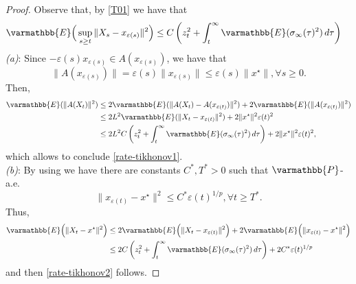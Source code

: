 \documentclass[11pt,reqno]{article}
\let\mathbb=\varmathbb
\renewcommand{\epsilon}{\varepsilon}
\newcommand{\1}{\mathds{1}}
\numberwithin{equation}{section}  %
\theoremstyle{plain}
\theoremstyle{definition}
\theoremstyle{remark}
\numberwithin{theorem}{section}
\numberwithin{remark}{section}
\numberwithin{example}{section}
\begin{document}
\begin{proof}
    Observe that, by \eqref{T01} we have  that 
    \begin{equation*}
        \begin{aligned}
        \mathbb{E}\Big(\sup_{s\geq t}\|X_{s}-x_{\epsilon(s)}\|^2\Big) 
		&\leq C \left( z_{t}^2  +  \int_{t}^\infty \mathbb{E}(\sigma_\infty(\tau)^2) \, d\tau \right)
        \end{aligned}
    \end{equation*}
    \emph{(a)}: Since $-\epsilon(s)x_{\epsilon(s)}\in A(x_{\epsilon(s)})$, we have that $$\|A(x_{\epsilon(s)})\| = \epsilon(s)\|x_{\epsilon(s)}\|\leq \epsilon(s)\|x^\star\|, \forall s\geq 0.$$
    Then,
    \begin{equation*}
        \begin{aligned}
            \mathbb{E}(\|A(X_t)\|^2) &\leq 2\mathbb{E}(\|A(X_t)-A(x_{\epsilon(t)})\|^2) + 2\mathbb{E}(\|A(x_{\epsilon(t)})\|^2)\\
            &\leq 2L^2\mathbb{E}(\|X_t-x_{\epsilon(t)}\|^2) + 2\|x^\star\|^2\epsilon(t)^2\\
            &\leq 2L^2C \left(z_t^2  +  \int_{t}^\infty \mathbb{E}(\sigma_\infty(\tau)^2) \, d\tau\right) + 2\|x^\star\|^2 \epsilon(t)^2,
        \end{aligned}
    \end{equation*}
    which allows to conclude \eqref{rate-tikhonov1}.\\
    \emph{(b)}: By using \cite[Proposition 23]{MR4991707} we have  there are constants $C^\ast, T^\ast>0$ such that $\mathbb{P}$-a.e.
    \begin{equation*}
        \|x_{\epsilon(t)}-x^\star\|^2\leq C^\ast \epsilon(t)^{1/p}, \forall t\geq T^\ast.
    \end{equation*}
    Thus, 
    \begin{equation*}
        \begin{aligned}
        \mathbb{E}\Big(\|X_{t}-x^\star\|^2\Big) &\leq 2\mathbb{E}\Big(\|X_{t}-x_{\epsilon(t)}\|^2\Big) + 2\mathbb{E}\Big(\| x_{\epsilon(t)} - x^\star\|^2\Big)\\
        &\leq 2 C  \left(  z_{t}^2  +  \int_{t}^\infty \mathbb{E}(\sigma_\infty(\tau)^2) \, d\tau \right) + 2C^\ast \epsilon(t)^{1/p}
        \end{aligned}
    \end{equation*}
    and then \eqref{rate-tikhonov2} follows.
\end{proof}

 
\end{document}
